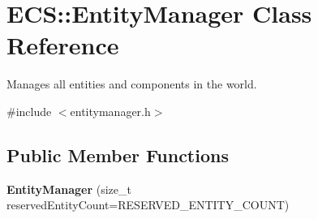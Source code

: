 \hypertarget{class_e_c_s_1_1_entity_manager}{\section{E\-C\-S\-:\-:Entity\-Manager Class Reference}
\label{class_e_c_s_1_1_entity_manager}
}


Manages all entities and components in the world.  




{\ttfamily \#include $<$entitymanager.\-h$>$}

\subsection*{Public Member Functions}
\begin{DoxyCompactItemize}
\item 
\hypertarget{class_e_c_s_1_1_entity_manager_a2b65211b0059901010486bcbedd84b96}{{\bfseries Entity\-Manager} (size\-\_\-t reserved\-Entity\-Count=R\-E\-S\-E\-R\-V\-E\-D\-\_\-\-E\-N\-T\-I\-T\-Y\-\_\-\-C\-O\-U\-N\-T)}\label{class_e_c_s_1_1_entity_manager_a2b65211b0059901010486bcbedd84b96}


\end{DoxyCompactItemize}
